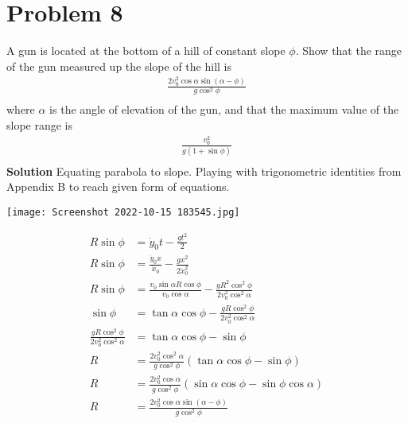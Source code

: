 \documentclass[]{article}
\newcommand{\bd}{\textbf}
\begin{document}
	\section{Problem 8}
	
	A gun is located at the bottom of a hill of constant slope $ \phi $. Show that the range of the gun measured up the slope of the hill is
	\begin{equation}
		\begin{split}
			\frac{2v_0^2 \cos \alpha \sin (\alpha - \phi)}{g \cos^2 \phi} \\
		\end{split}
	\end{equation}
	where $ \alpha $ is the angle of elevation of the gun, and that the maximum value of the slope range is
	\begin{equation}
		\begin{split}
			\frac{v_0^2}{g(1 + \sin \phi)} \\
		\end{split}
	\end{equation}
	\bd{Solution} Equating parabola to slope. Playing with trigonometric identities from Appendix B to reach given form of equations.
	\begin{center}
		\texttt{[image: Screenshot 2022-10-15 183545.jpg]}
	\end{center}
	\begin{equation}
		\begin{split}
			R \sin \phi &= \dot{y}_0 t - \frac{gt^2}{2} \\
			R \sin \phi &= \frac{\dot{y}_0 x}{\dot{x}_0} - \frac{gx^2}{2\dot{x}^2_0} \\
			R \sin \phi &= \frac{v_0 \sin \alpha R \cos \phi}{v_0 \cos \alpha} - \frac{g R^2 \cos^2 \phi}{2 v_0^2 \cos^2 \alpha} \\
			\sin \phi &=  \tan \alpha \cos \phi - \frac{g R \cos^2 \phi}{2 v_0^2 \cos^2 \alpha} \\
			\frac{g R \cos^2 \phi}{2 v_0^2 \cos^2 \alpha} &= \tan \alpha \cos \phi - \sin \phi \\
			R &= \frac{2 v_0^2 \cos^2 \alpha}{g \cos^2 \phi} (\tan \alpha \cos \phi - \sin \phi) \\
			R &= \frac{2 v_0^2 \cos \alpha}{g \cos^2 \phi} (\sin \alpha \cos \phi - \sin \phi \cos \alpha) \\
			R &= \frac{2 v_0^2 \cos \alpha \sin (\alpha - \phi)}{g \cos^2 \phi} \\
		\end{split}
	\end{equation}
\end{document}
